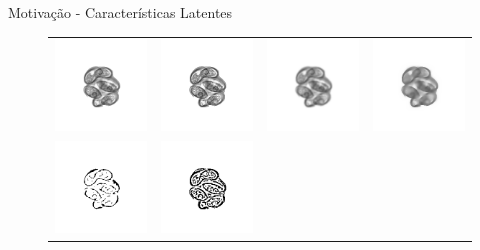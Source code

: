 \documentclass{beamer}
\begin{document}
\begin{frame}{Motivação - Características Latentes}

\begin{figure}[htbp]
 \begin{center}
 \begin{tabular}{c|c|c|c}
   \includegraphics[width=0.2\linewidth]{figuras/alga_05b.png}&
   \includegraphics[width=0.2\linewidth]{figuras/alga_05c.png}&
   \includegraphics[width=0.2\linewidth]{figuras/alga_05d.png}&
   \includegraphics[width=0.2\linewidth]{figuras/alga_05e.png} \\
   \includegraphics[width=0.2\linewidth]{figuras/alga_05bb.png}&
   \includegraphics[width=0.2\linewidth]{figuras/alga_05cb.png}&

\end{tabular}
\end{center}
\end{figure}
\end{frame}
\end{document}
